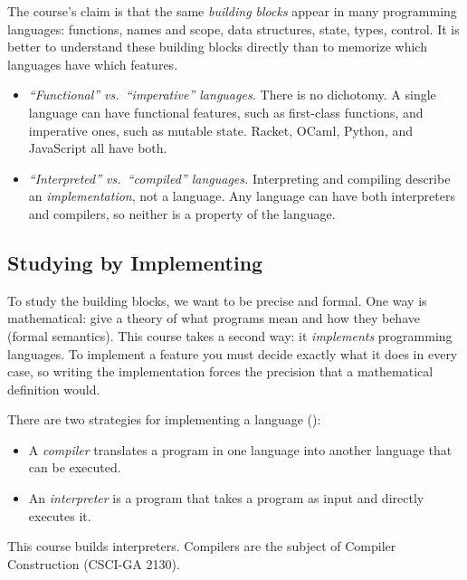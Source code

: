 The course's claim is that the same \emph{building blocks} appear in many programming languages: functions, names and scope, data structures, state, types, control. It is better to understand these building blocks directly than to memorize which languages have which features.

\begin{keypoint}
\begin{itemize}
  \item \emph{``Functional'' vs.\ ``imperative'' languages.} There is no dichotomy. A single language can have functional features, such as first-class functions, and imperative ones, such as mutable state. Racket, OCaml, Python, and JavaScript all have both.
  \item \emph{``Interpreted'' vs.\ ``compiled'' languages.} Interpreting and compiling describe an \emph{implementation}, not a language. Any language can have both interpreters and compilers, so neither is a property of the language.
\end{itemize}
\end{keypoint}

\subsection{Studying by Implementing}

To study the building blocks, we want to be precise and formal. One way is mathematical: give a theory of what programs mean and how they behave (formal semantics). This course takes a second way: it \emph{implements} programming languages. To implement a feature you must decide exactly what it does in every case, so writing the implementation forces the precision that a mathematical definition would.

There are two strategies for implementing a language ():
\begin{itemize}
  \item A \emph{compiler} translates a program in one language into another language that can be executed.
  \item An \emph{interpreter} is a program that takes a program as input and directly executes it.
\end{itemize}
This course builds interpreters. Compilers are the subject of Compiler Construction (CSCI-GA 2130).

